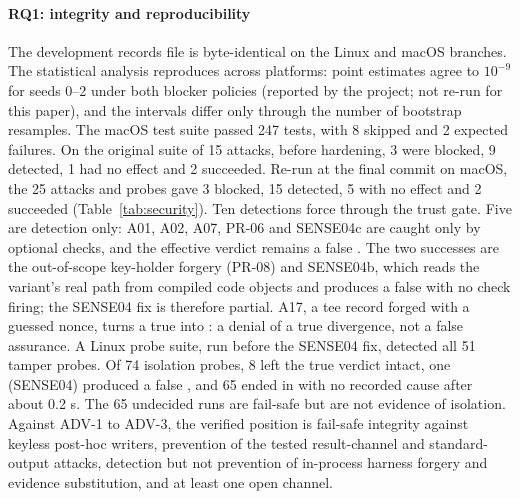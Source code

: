 \documentclass{ieeeaccess}
\begin{document}
\paragraph*{RQ1: integrity and reproducibility} The development records file is byte-identical on the Linux and macOS branches. The statistical analysis reproduces across platforms: point estimates agree to $10^{-9}$ for seeds 0--2 under both blocker policies (reported by the project; not re-run for this paper), and the intervals differ only through the number of bootstrap resamples. The macOS test suite passed 247 tests, with 8 skipped and 2 expected failures. On the original suite of 15 attacks, before hardening, 3 were blocked, 9 detected, 1 had no effect and 2 succeeded. Re-run at the final commit on macOS, the 25 attacks and probes gave 3 blocked, 15 detected, 5 with no effect and 2 succeeded (Table~\ref{tab:security}). Ten detections force \INS{} through the trust gate. Five are detection only: A01, A02, A07, PR-06 and SENSE04c are caught only by optional checks, and the effective verdict remains a false \NDO{}. The two successes are the out-of-scope key-holder forgery (PR-08) and SENSE04b, which reads the variant's real path from compiled code objects and produces a false \NDO{} with no check firing; the SENSE04 fix is therefore partial. A17, a tee record forged with a guessed nonce, turns a true \DIV{} into \INS{}: a denial of a true divergence, not a false assurance. A Linux probe suite, run before the SENSE04 fix, detected all 51 tamper probes. Of 74 isolation probes, 8 left the true verdict intact, one (SENSE04) produced a false \NDO{}, and 65 ended in \INS{} with no recorded cause after about 0.2 s. The 65 undecided runs are fail-safe but are not evidence of isolation. Against ADV-1 to ADV-3, the verified position is fail-safe integrity against keyless post-hoc writers, prevention of the tested result-channel and standard-output attacks, detection but not prevention of in-process harness forgery and evidence substitution, and at least one open channel.


\end{document}
